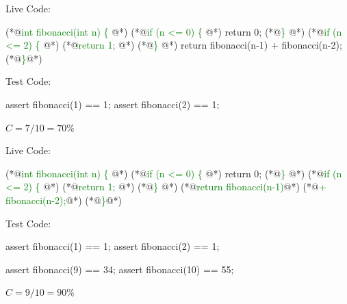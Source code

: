 \documentclass{article}
\begin{document}

\begin{multicols}{2}
Live Code:\par
{\small\begin{ffcode}
(*@\textcolor{green}{int fibonacci(int n) \{} @*)
  (*@\textcolor{green}{if (n <= 0) \{} @*)
    return 0;
  (*@\textcolor{green}{\}} @*)
  (*@\textcolor{green}{if (n <= 2) \{} @*)
    (*@\textcolor{green}{return 1;} @*)
  (*@\textcolor{green}{\}} @*)
  return fibonacci(n-1)
    + fibonacci(n-2);
(*@\textcolor{green}{\}}@*)
\end{ffcode}
}
\par\columnbreak\par
Test Code:\par
{\small\begin{ffcode}
assert fibonacci(1) == 1;
assert fibonacci(2) == 1;
\end{ffcode}
}
\( C = 7/10 = 70\% \)
\end{multicols}
\plush{}

\begin{multicols}{2}
Live Code:\par
{\small\begin{ffcode}
(*@\textcolor{green}{int fibonacci(int n) \{} @*)
  (*@\textcolor{green}{if (n <= 0) \{} @*)
    return 0;
  (*@\textcolor{green}{\}} @*)
  (*@\textcolor{green}{if (n <= 2) \{} @*)
    (*@\textcolor{green}{return 1;} @*)
  (*@\textcolor{green}{\}} @*)
  (*@\textcolor{green}{return fibonacci(n-1)}@*)
    (*@\textcolor{green}{+ fibonacci(n-2);}@*)
(*@\textcolor{green}{\}}@*)
\end{ffcode}
}
\par\columnbreak\par
Test Code:\par
{\small\begin{ffcode}
assert fibonacci(1) == 1;
assert fibonacci(2) == 1;

assert fibonacci(9) == 34;
assert fibonacci(10) == 55;
\end{ffcode}
}
\( C = 9/10 = 90\% \)
\end{multicols}
\plush{}

\end{document}
